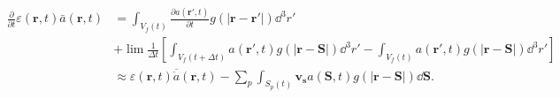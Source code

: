 \begin{equation}
\begin{align*}
\frac{\partial}{\partial t}\varepsilon (\mathbf{r},t) \bar{a}(\mathbf{r},t) 
&=
\int_{V_f(t)}{
\frac{\partial a(\mathbf{r'}, t)}{\partial t} g(|\mathbf{r}
- \mathbf{r'}| )  \dd^3 r'} \\
&+ \lim \frac{1}{\Delta t} \left[
\int_{V_f(t + \Delta t)}{ a(\mathbf{r'}, t) g(|\mathbf{r} - \mathbf{S}|)  \dd^3
r'} - \int_{V_f(t)}{ a(\mathbf{r'}, t) g(|\mathbf{r} - \mathbf{S}|)  \dd^3 r'}
\right ]\\
& \approx
\varepsilon (\mathbf{r},t) \overline{\dot{a}}(\mathbf{r},t) - 
\sum_{p}{\int_{S_p(t)}{\mathbf{v_s} a(\mathbf{S},t) g(|\mathbf{r} - \mathbf{S}|) 
\dd \mathbf{S}}}.
\end{align*}
 \label{eq:ddtepsa}
\end{equation}
